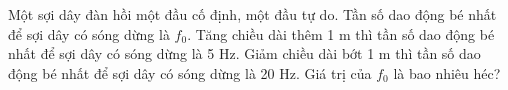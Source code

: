 \begin{ex}%
Một sợi dây đàn hồi một đầu cố định, một đầu tự do. Tần số dao động bé nhất để sợi dây có sóng dừng là $f_0$. Tăng chiều dài thêm 1 m thì tần số dao động bé nhất để sợi dây có sóng dừng là 5 Hz. Giảm chiều dài bớt 1 m thì tần số dao động bé nhất để sợi dây có sóng dừng là 20 Hz. Giá trị của $f_0$ là bao nhiêu héc?
\end{ex} 











